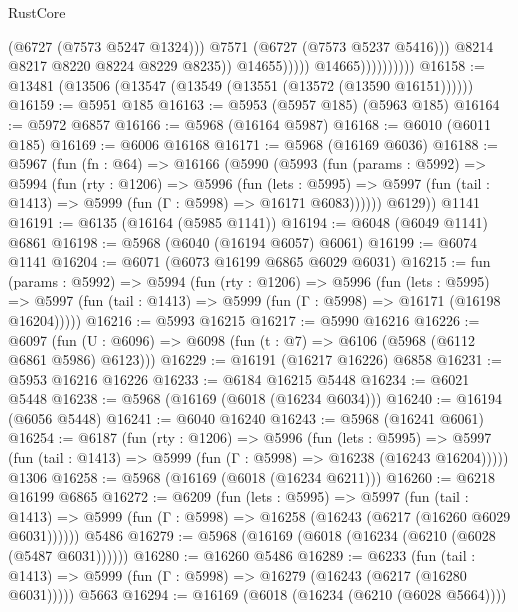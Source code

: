 \begin{lexlean}{RustCore}
\begin{coremodule}
                                          (@6727 (@7573 @5247 @1324)))
                                        @7571
                                        (@6727 (@7573 @5237 @5416)))
                                      @8214
                                      @8217
                                      @8220
                                      @8224
                                      @8229
                                      @8235))
                                  @14655)))))
                        @14665))))))))))
@16158 := @13481 (@13506 (@13547 (@13549 (@13551 (@13572 (@13590 @16151))))))
@16159 := @5951 @185
@16163 := @5953 (@5957 @185) (@5963 @185)
@16164 := @5972 @6857
@16166 := @5968 (@16164 @5987)
@16168 := @6010 (@6011 @185)
@16169 := @6006 @16168
@16171 := @5968 (@16169 @6036)
@16188 := @5967
    (fun (fn : @64) =>
    @16166
      (@5990
        (@5993
          (fun (params : @5992) =>
          @5994
            (fun (rty : @1206) =>
            @5996
              (fun (lets : @5995) =>
              @5997 (fun (tail : @1413) => @5999 (fun (Γ : @5998) => @16171 @6083))))))
        @6129))
    @1141
@16191 := @6135 (@16164 (@5985 @1141))
@16194 := @6048 (@6049 @1141) @6861
@16198 := @5968 (@6040 (@16194 @6057) @6061)
@16199 := @6074 @1141
@16204 := @6071 (@6073 @16199 @6865 @6029 @6031)
@16215 := fun (params : @5992) =>
  @5994
    (fun (rty : @1206) =>
    @5996
      (fun (lets : @5995) =>
      @5997 (fun (tail : @1413) => @5999 (fun (Γ : @5998) => @16171 (@16198 @16204)))))
@16216 := @5993 @16215
@16217 := @5990 @16216
@16226 := @6097 (fun (U : @6096) => @6098 (fun (t : @7) => @6106 (@5968 (@6112 @6861 @5986) @6123)))
@16229 := @16191 (@16217 @16226) @6858
@16231 := @5953 @16216 @16226
@16233 := @6184 @16215 @5448
@16234 := @6021 @5448
@16238 := @5968 (@16169 (@6018 (@16234 @6034)))
@16240 := @16194 (@6056 @5448)
@16241 := @6040 @16240
@16243 := @5968 (@16241 @6061)
@16254 := @6187
    (fun (rty : @1206) =>
    @5996
      (fun (lets : @5995) =>
      @5997 (fun (tail : @1413) => @5999 (fun (Γ : @5998) => @16238 (@16243 @16204)))))
    @1306
@16258 := @5968 (@16169 (@6018 (@16234 @6211)))
@16260 := @6218 @16199 @6865
@16272 := @6209
    (fun (lets : @5995) =>
    @5997
      (fun (tail : @1413) =>
      @5999 (fun (Γ : @5998) => @16258 (@16243 (@6217 (@16260 @6029 @6031))))))
    @5486
@16279 := @5968 (@16169 (@6018 (@16234 (@6210 (@6028 (@5487 @6031))))))
@16280 := @16260 @5486
@16289 := @6233
    (fun (tail : @1413) => @5999 (fun (Γ : @5998) => @16279 (@16243 (@6217 (@16280 @6031)))))
    @5663
@16294 := @16169 (@6018 (@16234 (@6210 (@6028 @5664))))

\end{coremodule}
\end{lexlean}
